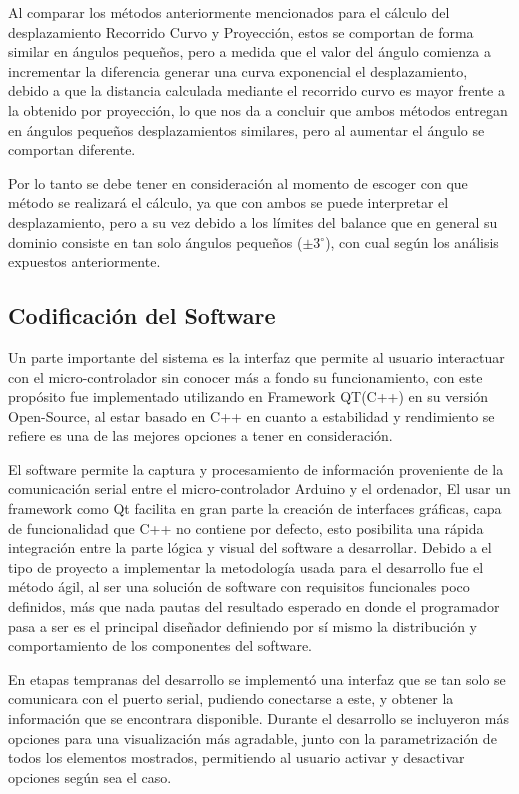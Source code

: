 \documentclass[12pt,a4paper]{article}
\newcommand{\grad}{$^{\circ}$}
\begin{document}
Al comparar los métodos anteriormente mencionados para el cálculo del desplazamiento Recorrido Curvo y Proyección, estos se comportan de forma similar en ángulos pequeños, pero a medida que el valor del ángulo comienza a incrementar la diferencia generar una curva exponencial el desplazamiento, debido a que la distancia calculada mediante el recorrido curvo es mayor frente a la obtenido por proyección, lo que nos da a concluir que ambos métodos entregan en ángulos pequeños desplazamientos similares, pero al aumentar el ángulo se comportan diferente.

Por lo tanto se debe tener en consideración al momento de escoger con que método se realizará el cálculo, ya que con ambos se puede interpretar el desplazamiento, pero a su vez debido a los límites del balance que en general su dominio consiste en tan solo ángulos pequeños ($\pm 3$\grad), con cual según los análisis expuestos anteriormente.


\newpage
\subsection{Codificación del Software}
Un parte importante del sistema es la interfaz que permite al usuario interactuar con el micro-controlador sin conocer más a fondo su funcionamiento,
con este propósito fue implementado utilizando en Framework QT(C++)\cite{QT} en su versión Open-Source, al estar basado en C++ en cuanto a estabilidad y rendimiento se refiere es una de las mejores opciones a tener en consideración.

El software permite la captura y procesamiento de información proveniente de la comunicación serial entre el micro-controlador Arduino y el ordenador,
El usar un framework como Qt facilita en gran parte la creación de interfaces gráficas, capa de funcionalidad que C++ no contiene por defecto, esto posibilita una rápida integración entre la parte lógica y visual del software a desarrollar.
Debido a el tipo de proyecto a implementar la metodología usada para el desarrollo fue el método ágil, al ser una solución de software con requisitos funcionales poco definidos, más que nada pautas del resultado esperado en donde el programador pasa a ser es el principal diseñador definiendo por sí mismo la distribución y comportamiento de los componentes del software.

En etapas tempranas del desarrollo se implementó una interfaz que se tan solo se comunicara con el puerto serial, pudiendo conectarse a este, y obtener la información que se encontrara disponible.
Durante el desarrollo se incluyeron más opciones para una visualización más agradable, junto con la parametrización de todos los elementos mostrados, permitiendo al usuario activar y desactivar opciones según sea el caso.
\end{document}

